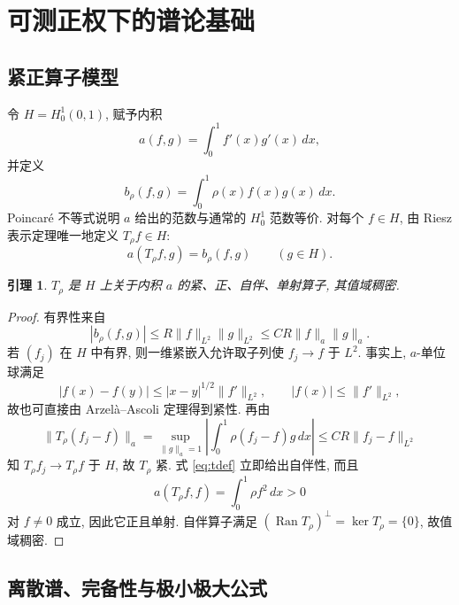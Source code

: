 \documentclass[UTF8]{ctexart}
\newtheorem{lemma}[theorem]{引理}
\begin{document}
\section{可测正权下的谱论基础}
\subsection{紧正算子模型}

令 $H=H^1_0(0,1)$, 赋予内积
\begin{equation}
	a(f,g)=\int_0^1 f'(x)g'(x)\,dx,
\end{equation}
并定义
\begin{equation}
	b_\rho(f,g)=\int_0^1 \rho(x)f(x)g(x)\,dx.
\end{equation}
Poincar\'e 不等式说明 $a$ 给出的范数与通常的 $H^1_0$ 范数等价. 对每个 $f\in H$,
由 Riesz 表示定理唯一地定义 $T_\rho f\in H$:
\begin{equation}
	a(T_\rho f,g)=b_\rho(f,g)\qquad(g\in H).
	\label{eq:tdef}
\end{equation}

\begin{lemma}\label{lem:compact}
$T_\rho$ 是 $H$ 上关于内积 $a$ 的紧、正、自伴、单射算子, 其值域稠密.
\end{lemma}

\begin{proof}
有界性来自
\begin{equation*}
	|b_\rho(f,g)|\le R\|f\|_{L^2}\|g\|_{L^2}\le CR\|f\|_a\|g\|_a .
\end{equation*}
若 $(f_j)$ 在 $H$ 中有界, 则一维紧嵌入允许取子列使 $f_j\to f$ 于 $L^2$. 事实上,
$a$-单位球满足
\begin{equation*}
	|f(x)-f(y)|\le |x-y|^{1/2}\|f'\|_{L^2},\qquad |f(x)|\le\|f'\|_{L^2},
\end{equation*}
故也可直接由 Arzel\`a--Ascoli 定理得到紧性. 再由
\begin{equation*}
	\|T_\rho(f_j-f)\|_a=\sup_{\|g\|_a=1}\left|\int_0^1\rho(f_j-f)g\,dx\right|
		\le CR\|f_j-f\|_{L^2}
\end{equation*}
知 $T_\rho f_j\to T_\rho f$ 于 $H$, 故 $T_\rho$ 紧. 式 \eqref{eq:tdef} 立即给出自伴性,
而且
\begin{equation*}
	a(T_\rho f,f)=\int_0^1\rho f^2\,dx>0
\end{equation*}
对 $f\ne0$ 成立, 因此它正且单射. 自伴算子满足 $(\operatorname{Ran}T_\rho)^\perp=\ker T_\rho=\{0\}$,
故值域稠密.
\end{proof}

\subsection{离散谱、完备性与极小极大公式}
\end{document}
